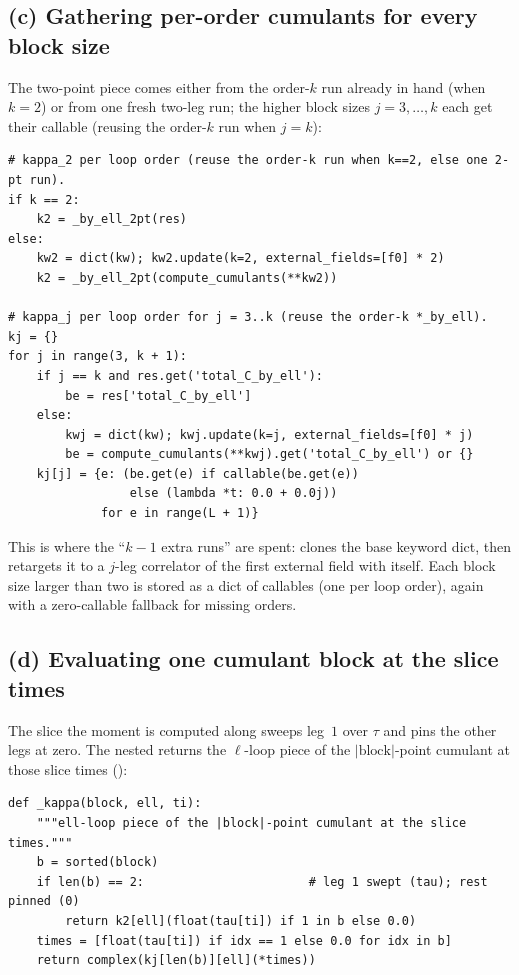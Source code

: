 \subsection*{(c) Gathering per-order cumulants for every block size}

The two-point piece comes either from the order-$k$ run already in hand (when
$k=2$) or from one fresh two-leg run; the higher block sizes $j=3,\ldots,k$ each
get their callable  (reusing the order-$k$ run when $j=k$):

\begin{lstlisting}
# kappa_2 per loop order (reuse the order-k run when k==2, else one 2-pt run).
if k == 2:
    k2 = _by_ell_2pt(res)
else:
    kw2 = dict(kw); kw2.update(k=2, external_fields=[f0] * 2)
    k2 = _by_ell_2pt(compute_cumulants(**kw2))

# kappa_j per loop order for j = 3..k (reuse the order-k *_by_ell).
kj = {}
for j in range(3, k + 1):
    if j == k and res.get('total_C_by_ell'):
        be = res['total_C_by_ell']
    else:
        kwj = dict(kw); kwj.update(k=j, external_fields=[f0] * j)
        be = compute_cumulants(**kwj).get('total_C_by_ell') or {}
    kj[j] = {e: (be.get(e) if callable(be.get(e))
                 else (lambda *t: 0.0 + 0.0j))
             for e in range(L + 1)}
\end{lstlisting}

This is where the ``$k-1$ extra runs'' are spent:  clones the base
keyword dict, then  retargets it to a
$j$-leg correlator of the first external field with itself. Each block size larger
than two is stored as a dict of callables (one per loop order), again with a
zero-callable fallback for missing orders.

\subsection*{(d) Evaluating one cumulant block at the slice times}

The slice the moment is computed along sweeps leg~$1$ over $\tau$ and pins the
other legs at zero. The nested  returns the
$\ell$-loop piece of the $|\text{block}|$-point cumulant at those slice times
():

\begin{lstlisting}
def _kappa(block, ell, ti):
    """ell-loop piece of the |block|-point cumulant at the slice times."""
    b = sorted(block)
    if len(b) == 2:                       # leg 1 swept (tau); rest pinned (0)
        return k2[ell](float(tau[ti]) if 1 in b else 0.0)
    times = [float(tau[ti]) if idx == 1 else 0.0 for idx in b]
    return complex(kj[len(b)][ell](*times))
\end{lstlisting}


